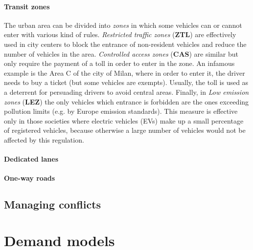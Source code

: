 \paragraph{Transit zones}

The urban area can be divided into \textit{zones} in which some vehicles can or cannot enter with various kind of rules. \textit{Restricted traffic zones} (\textbf{ZTL}) are effectively used in city centers to block the entrance of non-resident vehicles and reduce the number of vehicles in the area.
\textit{Controlled access zones} (\textbf{CAS}) are similar but only require the payment of a toll in order to enter in the zone. An infamous example is the Area C of the city of Milan, where in order to enter it, the driver needs to buy a ticket (but some vehicles are exempts). Usually, the toll is used as a deterrent for persuading drivers to avoid central areas.
Finally, in \textit{Low emission zones} (\textbf{LEZ}) the only vehicles which entrance is forbidden are the ones exceeding pollution limits (e.g. by Europe emission standards). This measure is effective only in those societies where electric vehicles (EVs) make up a small percentage of registered vehicles, because otherwise a large number of vehicles would not be affected by this regulation.


\paragraph{Dedicated lanes}


\paragraph{One-way roads}

\subsection{Managing conflicts}


\section{Demand models}

